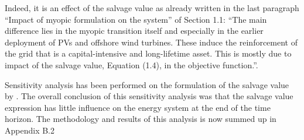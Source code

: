 \documentclass[12pt,a4paper]{article}
\begin{document}
\noindent Indeed, it is an effect of the salvage value as already written in the last paragraph ``Impact of myopic formulation on the system'' of Section 1.1: ``The main difference lies in the myopic transition itself and especially in the earlier
deployment of PVs and offshore wind turbines. These induce the reinforcement of the grid that is a capital-intensive and long-lifetime asset. This is mostly due to impact of the salvage value, Equation (1.4), in the objective function.''.

Sensitivity analysis has been performed on the formulation of the salvage value by \citet{goffauxpathway}. The overall conclusion of this sensitivity analysis was that the salvage value expression has little influence on the energy system at the end of the time horizon. The methodology and results of this analysis is now summed up {\color{blue}in Appendix B.2} 
\end{document}
